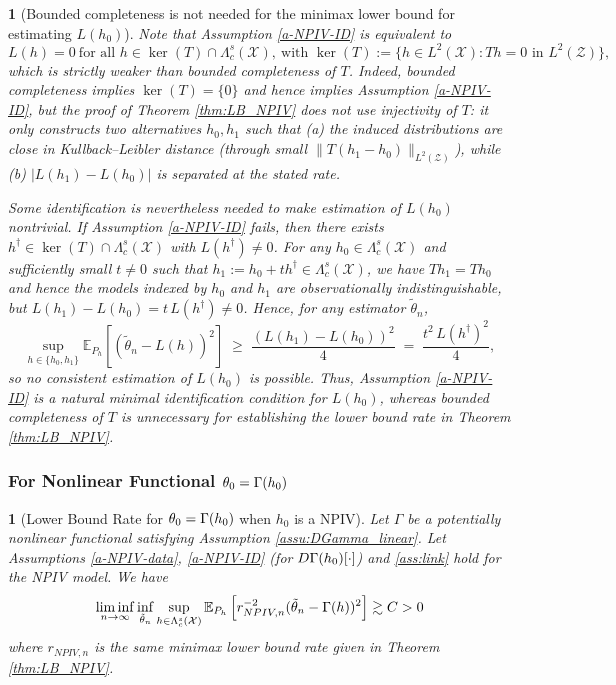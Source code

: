 \documentclass[12pt,american]{article}
\theoremstyle{definition}
\theoremstyle{plain}
\theoremstyle{definition}
\theoremstyle{plain}
\theoremstyle{plain}
\theoremstyle{plain}
\newtheorem{cor}{\protect\corollaryname}
\theoremstyle{plain}
\newtheorem{rem}{\protect\remarkname}
\theoremstyle{plain}
\newcommand{\E}{\mathbb{E}}
\providecommand{\remarkname}{Remark}
\providecommand{\corollaryname}{Corollary}
\begin{document}
\begin{rem}[Bounded completeness is not needed for the minimax lower bound for estimating $L(h_0)$]
  \label{rem:BC_not_needed_LB} Note that Assumption \ref{a-NPIV-ID} is equivalent to
  \[
    L(h)=0\  \text{for all } h\in \ker(T)\cap \Lambda_c^s(\mathcal{X}),
    \  \text{with~} \ker(T):=\{h\in L^2(\mathcal{X}): Th=0 \text{ in } L^2(\mathcal{Z})\},
  \]
  which is \emph{strictly weaker} than bounded completeness
  of $T$. Indeed, bounded completeness implies $\ker(T)=\{0\}$ and hence implies Assumption \ref{a-NPIV-ID},
  but the proof of Theorem \ref{thm:LB_NPIV} does not use injectivity of $T$:
  it only constructs two alternatives $h_0,h_1$ such that (a) the induced distributions are close in
  Kullback--Leibler distance (through small $\|T(h_1-h_0)\|_{L^2(\mathcal{Z})}$), while (b)
  $|L(h_1)-L(h_0)|$ is separated at the stated rate.

  Some identification is nevertheless needed to make estimation of $L(h_0)$ nontrivial.
  If Assumption \ref{a-NPIV-ID} fails, then there exists $h^\dagger\in \ker(T)\cap \Lambda_c^s(\mathcal{X})$ with
  $L(h^\dagger)\neq 0$. For any $h_0\in\Lambda_c^s(\mathcal{X})$ and sufficiently small $t\neq 0$
  such that $h_1:=h_0+t h^\dagger\in\Lambda_c^s(\mathcal{X})$, we have $Th_1=Th_0$ and hence the
  models indexed by $h_0$ and $h_1$ are observationally indistinguishable, but
  $L(h_1)-L(h_0)=t\,L(h^\dagger)\neq 0$. Hence, for any estimator $\tilde\theta_n$,
  \[
    \sup_{h\in\{h_0,h_1\}} \E_{P_h}\!\left[(\tilde\theta_n-L(h))^2\right]
    \;\ge\; \frac{(L(h_1)-L(h_0))^2}{4}
    \;=\; \frac{t^2\,L(h^\dagger)^2}{4},
  \]
  so no consistent estimation of $L(h_0)$ is possible. Thus,
  Assumption \ref{a-NPIV-ID} is a
  natural minimal identification condition for $L(h_0)$, whereas bounded
  completeness of $T$ is unnecessary for establishing the lower bound rate in Theorem \ref{thm:LB_NPIV}.
\end{rem}

\subsubsection{For Nonlinear Functional $\theta_0=\Gamma(h_0)$}

\begin{cor}[Lower Bound Rate for $\theta_0=\Gamma(h_0)$ when $h_0$ is a NPIV]\label{cor:NL_NPIV_LB}
  Let $\Gamma$ be a potentially nonlinear functional satisfying Assumption \ref{assu:DGamma_linear}. Let Assumptions \ref{a-NPIV-data}, \ref{a-NPIV-ID} (for $D\Gamma(h_0)[\cdot]$) and \ref{ass:link} hold for the NPIV model. We have
  \begin{align*}
    \liminf_{n \to \infty}  \inf_{\tilde{\theta}_n} \sup_{h \in \Lambda_c^s(\mathcal{X})} \E_{P_{h}} \left[r^{-2}_{NPIV,n} (\tilde{\theta}_n - \G(h))^2 \right] \gtrsim  C>0
  \end{align*}
  where $r_{NPIV,n} $ is the same minimax lower bound rate given in Theorem \ref{thm:LB_NPIV}.
\end{cor}
\end{document}
